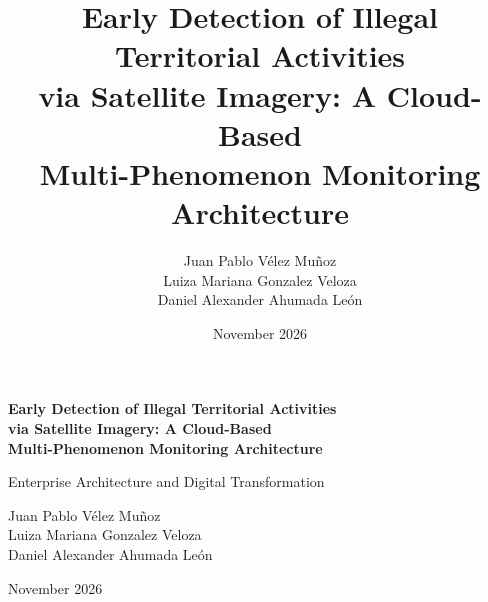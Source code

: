 \documentclass{article}
\title{%
  Early Detection of Illegal Territorial Activities\\
  via Satellite Imagery: A Cloud-Based\\
  Multi-Phenomenon Monitoring Architecture
}
\author{
  Juan Pablo Vélez Muñoz \\
  Luiza Mariana Gonzalez Veloza \\
  Daniel Alexander Ahumada León
}
\date{November 2026}
\begin{document}
\begin{titlepage}
    \centering
    \vspace*{2cm}
    {\Large \textbf{Early Detection of Illegal Territorial Activities\\
    via Satellite Imagery: A Cloud-Based\\
    Multi-Phenomenon Monitoring Architecture}\par}
    \vspace{1.5cm}
    {\Large Enterprise Architecture and Digital Transformation \par}
    \vspace{2cm}
    {\large
    Juan Pablo Vélez Muñoz \\
    Luiza Mariana Gonzalez Veloza \\
    Daniel Alexander Ahumada León
    \par}
    \vfill
    {\large November 2026 \par}
\end{titlepage}

\tableofcontents
\newpage
\end{document}

